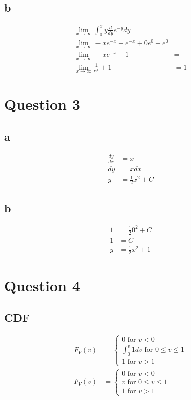 \documentclass[10pt,letterpaper]{paper}
\begin{document}
\subsection*{b}
\begin{align*}
  \lim_{x \to \infty } \int_0^x y \frac{d}{dy}e^{-y}dy &= \\
  \lim_{x \to \infty} -x e^{-x} - e^{-x} + 0e^0 + e^0 &= \\
  \lim_{x \to \infty} -x e^{-x} + 1 &= \\
  \lim_{x \to \infty} \frac{1}{e^{x}} + 1 &= 1
\end{align*}

\section*{Question 3}

\subsection*{a}

\begin{align*}
  \frac{dy}{dx}&=x\\
  dy &= xdx\\
  y &= \frac{1}{2}x^2 + C
\end{align*}

\subsection*{b}

\begin{align*}
  1 &= \frac{1}{2}0^2 + C\\
  1 &= C\\
  y &= \frac{1}{2}x^2 + 1
\end{align*}


\section*{Question 4}

\subsection*{CDF}

\begin{align*}
  F_V (v) &=
  \begin{cases}
    0 \text{ for } v < 0\\
    \int_0^v 1dv \text{ for } 0 \leq v \leq 1\\
    1 \text{ for } v > 1
  \end{cases}\\
  F_V(v) &=
  \begin{cases}
    0 \text{ for } v < 0\\
    v \text{ for } 0 \leq v \leq 1\\
    1 \text{ for } v > 1
  \end{cases}
\end{align*}
\end{document}
